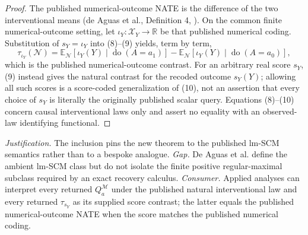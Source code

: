 \documentclass{article}
\begin{document}
\begin{proof}
The published numerical-outcome NATE is the difference of the two interventional means (de Aguas et al., Definition 4, \cite{pmlr-v286-aguas25a}).  On the common finite numerical-outcome setting, let \(\iota_Y:\mathcal X_Y\to\mathbb R\) be that published numerical coding.  Substitution of \(s_Y=\iota_Y\) into (8)--(9) yields, term by term,
\[
\tau_{\iota_Y}(\mathcal N)
=\mathbb E_{\mathcal N}\!\left[\iota_Y(Y)\mid\operatorname{do}(A=a_1)\right]
-\mathbb E_{\mathcal N}\!\left[\iota_Y(Y)\mid\operatorname{do}(A=a_0)\right],
\tag{10}
\]
which is the published numerical-outcome contrast.  For an arbitrary real score \(s_Y\), (9) instead gives the natural contrast for the recoded outcome \(s_Y(Y)\); allowing all such scores is a score-coded generalization of (10), not an assertion that every choice of \(s_Y\) is literally the originally published scalar query.  Equations (8)--(10) concern causal interventional laws only and assert no equality with an observed-law identifying functional.
\end{proof}
\par\smallskip\noindent \textit{Justification.} The inclusion pins the new theorem to the published lm-SCM semantics rather than to a bespoke analogue. \textit{Gap.} De Aguas et al. define the ambient lm-SCM class but do not isolate the finite positive regular-maximal subclass required by an exact recovery calculus. \textit{Consumer.} Applied analyses can interpret every returned \(Q_a^{\mathcal M}\) under the published natural interventional law and every returned \(\tau_{s_Y}\) as its supplied score contrast; the latter equals the published numerical-outcome NATE when the score matches the published numerical coding.
\end{document}
